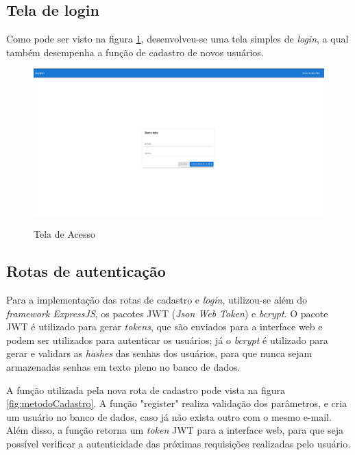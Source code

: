 \subsection{Tela de login}
Como pode ser visto na figura \ref{fig:login}, desenvolveu-se uma tela simples de \textit{login}, a qual também desempenha a função de cadastro de novos usuários.

\begin{figure}[!htb]
	\centering
	\caption{Tela de Acesso}
	\includegraphics[width=1\textwidth]{./dados/figuras/telaLogin}
	\label{fig:login}
\end{figure}
\pagebreak

\subsection{Rotas de autenticação}
Para a implementação das rotas de cadastro e \textit{login}, utilizou-se além do \textit{framework ExpressJS}, os pacotes JWT (\textit{Json Web Token}) e \textit{bcrypt}. O pacote JWT é utilizado para gerar \textit{tokens}, que são enviados para a interface web e podem ser utilizados para autenticar os usuários; já o \textit{bcrypt} é utilizado para gerar e validars as \textit{hashes} das senhas dos usuários, para que nunca sejam armazenadas senhas em texto pleno no banco de dados.

A função utilizada pela nova rota de cadastro pode vista na figura \ref{fig:metodoCadastro}. A função "register" realiza validação dos parâmetros, e cria um usuário no banco de dados, caso já não exista outro com o mesmo e-mail. Além disso, a função retorna um \textit{token} JWT para a interface web, para que seja possível verificar a autenticidade das próximas requisições realizadas pelo usuário. 

